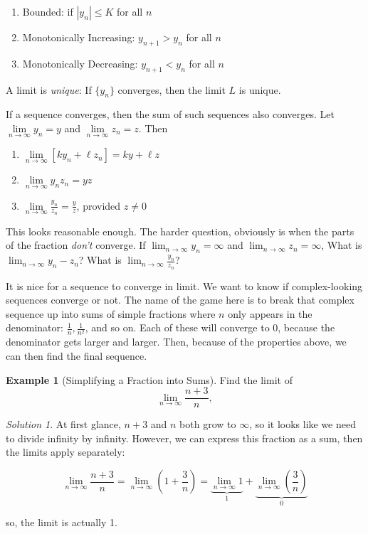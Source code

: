 \documentclass[
]{book}
\providecommand{\tightlist}{%
  \setlength{\itemsep}{0pt}\setlength{\parskip}{0pt}}
\theoremstyle{definition}
\theoremstyle{definition}
\newtheorem{example}{Example}[chapter]
\theoremstyle{definition}
\theoremstyle{definition}
\theoremstyle{remark}
\newtheorem*{solution}{Solution}
\begin{document}
\begin{enumerate}
\def\labelenumi{\arabic{enumi}.}
\tightlist
\item
  Bounded: if \(|y_n|\le K\) for all \(n\)
\item
  Monotonically Increasing: \(y_{n+1}>y_n\) for all \(n\)
\item
  Monotonically Decreasing: \(y_{n+1}<y_n\) for all \(n\)
\end{enumerate}

A limit is \emph{unique}: If \(\{y_n\}\) converges, then the limit \(L\) is unique.

If a sequence converges, then the sum of such sequences also converges. Let \(\lim\limits_{n \to \infty} y_n = y\) and \(\lim\limits_{n \to \infty} z_n =z\). Then

\begin{enumerate}
\def\labelenumi{\arabic{enumi}.}
\tightlist
\item
  \(\lim\limits_{n \to \infty} [k y_n + \ell z_n]= k y + \ell z\)
\item
  \(\lim\limits_{n \to \infty} y_n z_n = yz\)
\item
  \(\lim\limits_{n \to \infty} \frac{y_n}{z_n} = \frac{y}{z}\), provided \(z\neq 0\)
\end{enumerate}

This looks reasonable enough. The harder question, obviously is when the parts of the fraction \emph{don't} converge. If \(\lim_{n\to\infty} y_n = \infty\) and \(\lim_{n\to\infty} z_n = \infty\), What is \(\lim_{n\to\infty} y_n - z_n\)? What is \(\lim_{n\to\infty} \frac{y_n}{z_n}\)?

It is nice for a sequence to converge in limit. We want to know if complex-looking sequences converge or not. The name of the game here is to break that complex sequence up into sums of simple fractions where \(n\) only appears in the denominator: \(\frac{1}{n}, \frac{1}{n^2}\), and so on. Each of these will converge to 0, because the denominator gets larger and larger. Then, because of the properties above, we can then find the final sequence.

\begin{example}[Simplifying a Fraction into Sums]
\protect\hypertarget{exm:unnamed-chunk-190}{}{\label{exm:unnamed-chunk-190} {} }Find the limit of
\[\lim_{n\to \infty} \frac{n + 3}{n},\]
\end{example}

\begin{solution}
{}At first glance, \(n + 3\) and \(n\) both grow to \(\infty\), so it looks like we need to divide infinity by infinity. However, we can express this fraction as a sum, then the limits apply separately:

\[\lim_{n\to \infty} \frac{n + 3}{n} = \lim_{n\to \infty} \left(1 + \frac{3}{n}\right) =  \underbrace{\lim_{n\to \infty}1}_{1} +  \underbrace{\lim_{n\to \infty}\left(\frac{3}{n}\right)}_{0}\]

so, the limit is actually 1.
\end{solution}
\end{document}
